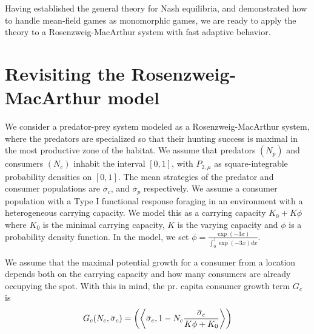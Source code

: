 Having established the general theory for Nash equilibria, and demonstrated how to handle mean-field games as monomorphic games, we are ready to apply the theory to a Rosenzweig-MacArthur system with fast adaptive behavior.
\section{Revisiting the Rosenzweig-MacArthur model}
\label{sec:model_rm}
We consider a predator-prey system modeled as a Rosenzweig-MacArthur system, where the predators are specialized so that their hunting success is maximal in the most productive zone of the habitat.
We assume that predators $(N_p)$ and consumers $(N_c)$ inhabit the interval $[0,1]$, with $P_{2,\mu}$ as square-integrable probability densities on $[0,1]$. The mean strategies of the predator and consumer populations are $\overbar{\sigma}_c$, and $\overbar{\sigma}_p$ respectively. We assume a consumer population with a Type I functional response foraging in an environment with a heterogeneous carrying capacity. We model this as a carrying capacity $K_0 + K \phi$ where $K_0$ is the minimal carrying capacity, $K$ is the varying capacity and $\phi$ is a probability density function. In the model, we set  $\phi = \frac{\exp(-3 x)}{\int_0^1 \exp(-3 x) dx}$.

We assume that the maximal potential growth for a consumer from a location depends both on the carrying capacity and how many consumers are already occupying the spot. With this in mind, the pr. capita consumer growth term $G_c$ is
\begin{equation}
  G_c(N_c, \overbar{\sigma}_c) = \pa{\ip{\overbar{\sigma}_c}{1-N_c \frac{\overbar{\sigma}_c}{K\phi + K_0}}}
\end{equation}

